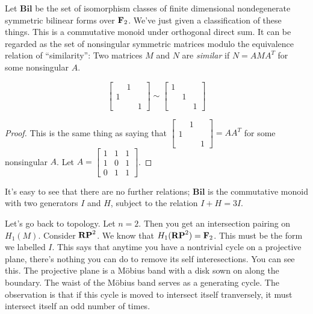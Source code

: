 Let $\mathbf{Bil}$ be the set of isomorphism classes of finite dimensional 
nondegenerate symmetric bilinear forms over $\mathbf F_2$. We've just given a classification of these things. This is a commutative monoid under orthogonal
direct sum. It can be
regarded as the set of nonsingular symmetric matrices modulo the equivalence
relation of ``similarity'': Two matrices $M$ and $N$ are {\em similar} if  
$N=AMA^T$ for some nonsingular $A$.
\begin{claim}
\begin{equation*}
\left[\begin{array}{ccc}
 & 1 & \\
1 & & \\
 & & 1
\end{array}\right]
\sim
\left[\begin{array}{ccc}
1 & & \\
& 1 & \\
& & 1
\end{array}\right]
\end{equation*}
\end{claim}
\begin{proof}
This is the same thing as saying that 
$\left[\begin{array}{ccc} & 1 & \\ 1 & & \\ & & 1\end{array}\right]=AA^T$ 
for some nonsingular $A$. Let 
$
A=\left[\begin{array}{ccc}1&1&1 \\ 1&0&1 \\ 0&1&1 \end{array}\right]$.
\end{proof}
It's easy to see that there are no further relations; 
$\mathbf{Bil}$ is the commutative monoid with two generators $I$ and $H$, 
subject to the relation $I+H=3I$. 

Let's go back to topology. Let $n=2$. Then you get an intersection pairing on $ H_1(M)$. Consider $\mathbf{RP}^2$. We know that $ H_1(\mathbf{RP}^2)=\mathbf F_2$. This must be the form we labelled $I$. This says that anytime you have a nontrivial cycle on a projective plane, there's nothing you can do to remove its self interesections. You can see this. The projective plane is a M\"obius band with a 
disk sown on along the boundary. The waist of the M\"obius band serves as a
generating cycle. The observation is that if this cycle is moved to intersect 
itself tranversely, it must intersect itself an odd number of times. 

